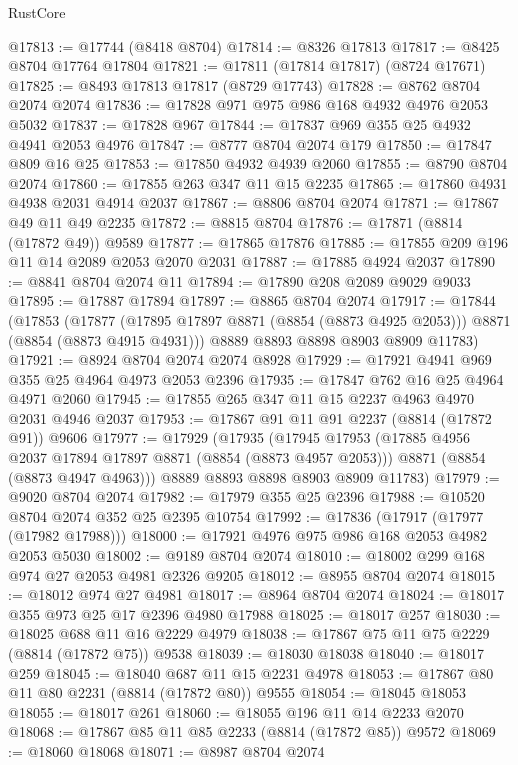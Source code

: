 \begin{lexlean}{RustCore}
\begin{coremodule}
@17813 := @17744 (@8418 @8704)
@17814 := @8326 @17813
@17817 := @8425 @8704 @17764 @17804
@17821 := @17811 (@17814 @17817) (@8724 @17671)
@17825 := @8493 @17813 @17817 (@8729 @17743)
@17828 := @8762 @8704 @2074 @2074
@17836 := @17828 @971 @975 @986 @168 @4932 @4976 @2053 @5032
@17837 := @17828 @967
@17844 := @17837 @969 @355 @25 @4932 @4941 @2053 @4976
@17847 := @8777 @8704 @2074 @179
@17850 := @17847 @809 @16 @25
@17853 := @17850 @4932 @4939 @2060
@17855 := @8790 @8704 @2074
@17860 := @17855 @263 @347 @11 @15 @2235
@17865 := @17860 @4931 @4938 @2031 @4914 @2037
@17867 := @8806 @8704 @2074
@17871 := @17867 @49 @11 @49 @2235
@17872 := @8815 @8704
@17876 := @17871 (@8814 (@17872 @49)) @9589
@17877 := @17865 @17876
@17885 := @17855 @209 @196 @11 @14 @2089 @2053 @2070 @2031
@17887 := @17885 @4924 @2037
@17890 := @8841 @8704 @2074 @11
@17894 := @17890 @208 @2089 @9029 @9033
@17895 := @17887 @17894
@17897 := @8865 @8704 @2074
@17917 := @17844
    (@17853
      (@17877 (@17895 @17897 @8871 (@8854 (@8873 @4925 @2053))) @8871 (@8854 (@8873 @4915 @4931)))
      @8889
      @8893
      @8898
      @8903
      @8909
      @11783)
@17921 := @8924 @8704 @2074 @2074 @8928
@17929 := @17921 @4941 @969 @355 @25 @4964 @4973 @2053 @2396
@17935 := @17847 @762 @16 @25 @4964 @4971 @2060
@17945 := @17855 @265 @347 @11 @15 @2237 @4963 @4970 @2031 @4946 @2037
@17953 := @17867 @91 @11 @91 @2237 (@8814 (@17872 @91)) @9606
@17977 := @17929
    (@17935
      (@17945
        @17953
        (@17885 @4956 @2037 @17894 @17897 @8871 (@8854 (@8873 @4957 @2053)))
        @8871
        (@8854 (@8873 @4947 @4963)))
      @8889
      @8893
      @8898
      @8903
      @8909
      @11783)
@17979 := @9020 @8704 @2074
@17982 := @17979 @355 @25 @2396
@17988 := @10520 @8704 @2074 @352 @25 @2395 @10754
@17992 := @17836 (@17917 (@17977 (@17982 @17988)))
@18000 := @17921 @4976 @975 @986 @168 @2053 @4982 @2053 @5030
@18002 := @9189 @8704 @2074
@18010 := @18002 @299 @168 @974 @27 @2053 @4981 @2326 @9205
@18012 := @8955 @8704 @2074
@18015 := @18012 @974 @27 @4981
@18017 := @8964 @8704 @2074
@18024 := @18017 @355 @973 @25 @17 @2396 @4980 @17988
@18025 := @18017 @257
@18030 := @18025 @688 @11 @16 @2229 @4979
@18038 := @17867 @75 @11 @75 @2229 (@8814 (@17872 @75)) @9538
@18039 := @18030 @18038
@18040 := @18017 @259
@18045 := @18040 @687 @11 @15 @2231 @4978
@18053 := @17867 @80 @11 @80 @2231 (@8814 (@17872 @80)) @9555
@18054 := @18045 @18053
@18055 := @18017 @261
@18060 := @18055 @196 @11 @14 @2233 @2070
@18068 := @17867 @85 @11 @85 @2233 (@8814 (@17872 @85)) @9572
@18069 := @18060 @18068
@18071 := @8987 @8704 @2074

\end{coremodule}
\end{lexlean}

